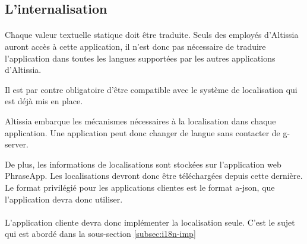 \subsection{L'internalisation}
\label{subsec:i18n}

\paragraph{}
Chaque valeur textuelle statique\fnmark{} doit être traduite. Seuls des employés d'Altissia auront accès à cette application, il n'est donc pas nécessaire de traduire l'application dans toutes les langues supportées par les autres applications d'Altissia\fnmark{}.

Il est par contre obligatoire d'être compatible avec le système de localisation qui est déjà mis en place.

Altissia embarque les mécanismes nécessaires à la localisation dans chaque application. Une application peut donc changer de langue sans contacter de \gls{g-server}.

De plus, les informations de localisations sont stockées sur l'application web PhraseApp.
Les localisations devront donc être téléchargées depuis cette dernière.
Le format privilégié pour les applications clientes est le format \gls{a-json}, que l'application devra donc utiliser.

\paragraph{}
L'application cliente devra donc implémenter la localisation seule. C'est le sujet qui est abordé dans la sous-section \ref{subsec:i18n-imp}
